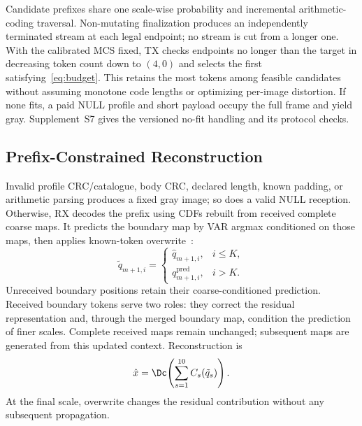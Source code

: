 Candidate prefixes share one scale-wise probability and incremental arithmetic-coding traversal. Non-mutating finalization produces an independently terminated stream at each legal endpoint; no stream is cut from a longer one. With the calibrated MCS fixed, TX checks endpoints no longer than the target in decreasing token count down to $(4,0)$ and selects the first satisfying~\eqref{eq:budget}. This retains the most tokens among feasible candidates without assuming monotone code lengths or optimizing per-image distortion. If none fits, a paid NULL profile and short payload occupy the full frame and yield gray. Supplement~S7 gives the versioned no-fit handling and its protocol checks.

\ifCLASSOPTIONonecolumn\else\fi
\subsection{Prefix-Constrained Reconstruction}
Invalid profile CRC/catalogue, body CRC, declared length, known padding, or arithmetic parsing produces a fixed gray image; so does a valid NULL reception. Otherwise, RX decodes the prefix using CDFs rebuilt from received complete coarse maps. It predicts the boundary map by VAR argmax conditioned on those maps, then applies known-token overwrite~\cite{var}:
\begin{equation}
 \tilde q_{m+1,i}=\begin{cases}\hat q_{m+1,i},&i\leq K,\\q^{\mathrm{pred}}_{m+1,i},&i>K.\end{cases}
 \label{eq:overwrite}
\end{equation}
Unreceived boundary positions retain their coarse-conditioned prediction. Received boundary tokens serve two roles: they correct the residual representation and, through the merged boundary map, condition the prediction of finer scales. Complete received maps remain unchanged; subsequent maps are generated from this updated context. Reconstruction is
\begin{equation}
 \hat x=\Dc\!\left(\sum_{s=1}^{10}C_s(\tilde q_s)\right).
 \label{eq:reconstruction}
\end{equation}
At the final scale, overwrite changes the residual contribution without any subsequent propagation.
